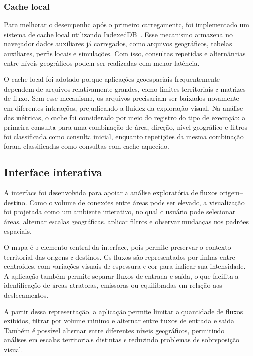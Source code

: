 \documentclass[12pt]{article}
\begin{document}
\subsubsection*{Cache local}

Para melhorar o desempenho após o primeiro carregamento, foi implementado um sistema de cache local utilizando IndexedDB~\cite{indexeddbDocs}. Esse mecanismo armazena no navegador dados auxiliares já carregados, como arquivos geográficos, tabelas auxiliares, perfis locais e simulações. Com isso, consultas repetidas e alternâncias entre níveis geográficos podem ser realizadas com menor latência.

O cache local foi adotado porque aplicações geoespaciais frequentemente dependem de arquivos relativamente grandes, como limites territoriais e matrizes de fluxo. Sem esse mecanismo, os arquivos precisariam ser baixados novamente em diferentes interações, prejudicando a fluidez da exploração visual. Na análise das métricas, o cache foi considerado por meio do registro do tipo de execução: a primeira consulta para uma combinação de área, direção, nível geográfico e filtros foi classificada como consulta inicial, enquanto repetições da mesma combinação foram classificadas como consultas com cache aquecido.

\subsection{Interface interativa}

A interface foi desenvolvida para apoiar a análise exploratória de fluxos origem--destino. Como o volume de conexões entre áreas pode ser elevado, a visualização foi projetada como um ambiente interativo, no qual o usuário pode selecionar áreas, alternar escalas geográficas, aplicar filtros e observar mudanças nos padrões espaciais.

O mapa é o elemento central da interface, pois permite preservar o contexto territorial das origens e destinos. Os fluxos são representados por linhas entre centroides, com variações visuais de espessura e cor para indicar sua intensidade. A aplicação também permite separar fluxos de entrada e saída, o que facilita a identificação de áreas atratoras, emissoras ou equilibradas em relação aos deslocamentos.

A partir dessa representação, a aplicação permite limitar a quantidade de fluxos exibidos, filtrar por volume mínimo e alternar entre fluxos de entrada e saída. Também é possível alternar entre diferentes níveis geográficos, permitindo análises em escalas territoriais distintas e reduzindo problemas de sobreposição visual.
\end{document}
